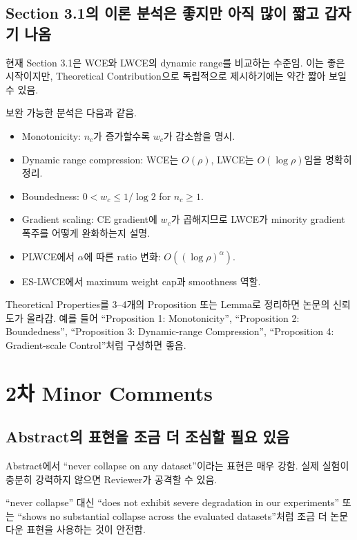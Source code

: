 \documentclass[11pt,a4paper]{article}
\begin{document}
\subsection{Section 3.1의 이론 분석은 좋지만 아직 많이 짧고 갑자기 나옴}

현재 Section 3.1은 WCE와 LWCE의 dynamic range를 비교하는 수준임. 이는 좋은 시작이지만, Theoretical Contribution으로 독립적으로 제시하기에는 약간 짧아 보일 수 있음.

보완 가능한 분석은 다음과 같음.

\begin{itemize}
\item Monotonicity: \(n_c\)가 증가할수록 \(w_c\)가 감소함을 명시.
\item Dynamic range compression: WCE는 \(O(\rho)\), LWCE는 \(O(\log \rho)\)임을 명확히 정리.
\item Boundedness: \(0<w_c\leq 1/\log 2\) for \(n_c\geq1\).
\item Gradient scaling: CE gradient에 \(w_c\)가 곱해지므로 LWCE가 minority gradient 폭주를 어떻게 완화하는지 설명.
\item PLWCE에서 \(\alpha\)에 따른 ratio 변화: \(O((\log \rho)^\alpha)\).
\item ES-LWCE에서 maximum weight cap과 smoothness 역할.
\end{itemize}

\begin{tcolorbox}[title=수정 권장]
Theoretical Properties를 3--4개의 Proposition 또는 Lemma로 정리하면 논문의 신뢰도가 올라감. 예를 들어 ``Proposition 1: Monotonicity'', ``Proposition 2: Boundedness'', ``Proposition 3: Dynamic-range Compression'', ``Proposition 4: Gradient-scale Control''처럼 구성하면 좋음.
\end{tcolorbox}


\section{2차 Minor Comments}

\subsection{Abstract의 표현을 조금 더 조심할 필요 있음}

Abstract에서 ``never collapse on any dataset''이라는 표현은 매우 강함. 실제 실험이 충분히 강력하지 않으면 Reviewer가 공격할 수 있음.

\begin{tcolorbox}[title=수정 권장]
``never collapse'' 대신 ``does not exhibit severe degradation in our experiments'' 또는 ``shows no substantial collapse across the evaluated datasets''처럼 조금 더 논문다운 표현을 사용하는 것이 안전함.
\end{tcolorbox}
\end{document}
